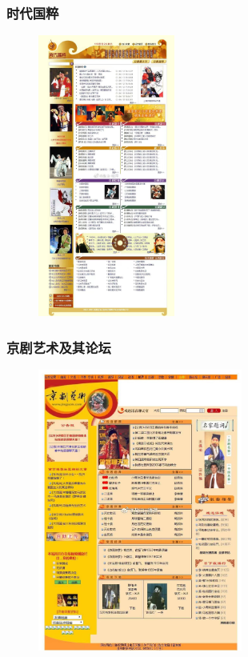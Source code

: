 \documentclass[cjk,slidestop,compress,mathserif,blue]{beamer}
\begin{document}
\frame
{
	\frametitle{时代国粹}
\begin{figure}[h!]
\centering
\vspace{-0.2in}
\includegraphics[height=0.8\textwidth,width=0.4\textwidth,clip]{Figures_Peking-Opera/PekOpe_Shidai.jpg}
\label{Shidai}
\end{figure}
}

\frame
{
	\frametitle{京剧艺术及其论坛}
\begin{figure}[h!]
\centering
\vspace{-0.2in}
\includegraphics[height=0.8\textwidth,width=0.6\textwidth,clip]{Figures_Peking-Opera/PekOpe_Jingyi.jpg}
\label{Jingyi-1}
\end{figure}
}
\end{document}
